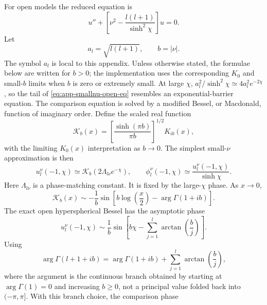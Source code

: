 \documentclass[11pt,a4paper]{article}
\newcommand{\abs}[1]{\left|#1\right|}
\begin{document}
For open models the reduced equation is
\begin{equation}
  u''+\left[\nu^2-\frac{l(l+1)}{\sinh^2\chi}\right]u=0.
  \label{eq:app-smallnu-open-eq}
\end{equation}
Let
\begin{equation}
  a_l=\sqrt{l(l+1)},\qquad b=\abs{\nu}.
\end{equation}
The symbol \(a_l\) is local to this appendix.  Unless otherwise stated, the
formulae below are written for \(b>0\); the implementation uses the
corresponding \(K_0\) and small-\(b\) limits when \(b\) is zero or extremely
small.  At large \(\chi\),
\(a_l^2/\sinh^2\chi\simeq4a_l^2e^{-2\chi}\), so the tail of
\eqref{eq:app-smallnu-open-eq} resembles an exponential-barrier equation.  The
comparison equation is solved by a modified Bessel, or Macdonald, function of
imaginary order.  Define the scaled real function
\begin{equation}
  \mathcal K_b(x)=
  \left[\frac{\sinh(\pi b)}{\pi b}\right]^{1/2}K_{ib}(x),
  \label{eq:app-scaled-K}
\end{equation}
with the limiting \(K_0(x)\) interpretation as \(b\to0\).  The simplest
small-\(\nu\) approximation is then
\begin{equation}
  u_l^\nu(-1,\chi)\simeq
  \mathcal K_b\!\left(2\Lambda_{l\nu}e^{-\chi}\right),\qquad
  \phi_l^\nu(-1,\chi)\simeq\frac{u_l^\nu(-1,\chi)}{\sinh\chi}.
  \label{eq:app-smallnu-simple}
\end{equation}
Here \(\Lambda_{l\nu}\) is a phase-matching constant.  It is fixed by the large-\(\chi\) phase.  As \(x\to0\),
\begin{equation}
  \mathcal K_b(x)\sim
  -\frac{1}{b}\sin\!\left[
  b\log\!\left(\frac{x}{2}\right)-\arg\Gamma(1+ib)
  \right].
  \label{eq:app-smallnu-K-smallx}
\end{equation}
The exact open hyperspherical Bessel has the asymptotic phase
\begin{equation}
  u_l^\nu(-1,\chi)\sim
  \frac{1}{b}\sin\!\left[
  b\chi-\sum_{j=1}^{l}\arctan\!\left(\frac{b}{j}\right)
  \right].
  \label{eq:app-smallnu-tail-phase}
\end{equation}
Using
\begin{equation}
  \arg\Gamma(l+1+ib)=
  \arg\Gamma(1+ib)+
  \sum_{j=1}^{l}\arctan\!\left(\frac{b}{j}\right),
\end{equation}
where the argument is the continuous branch obtained by starting at
\(\arg\Gamma(1)=0\) and increasing \(b\ge0\), not a principal value folded
back into \((-\pi,\pi]\).  With this branch choice, the comparison phase
\end{document}
